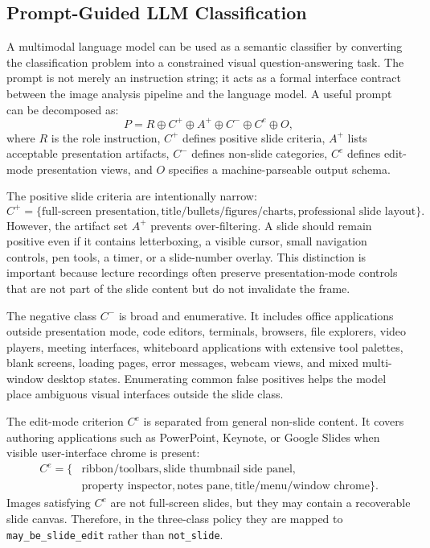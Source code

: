 \documentclass[11pt]{article}
\begin{document}
\subsection{Prompt-Guided LLM Classification}

A multimodal language model can be used as a semantic classifier by converting the classification problem into a constrained visual question-answering task. The prompt is not merely an instruction string; it acts as a formal interface contract between the image analysis pipeline and the language model. A useful prompt can be decomposed as:
\[
P = R \oplus C^+ \oplus A^+ \oplus C^- \oplus C^e \oplus O,
\]
where $R$ is the role instruction, $C^+$ defines positive slide criteria, $A^+$ lists acceptable presentation artifacts, $C^-$ defines non-slide categories, $C^e$ defines edit-mode presentation views, and $O$ specifies a machine-parseable output schema.

The positive slide criteria are intentionally narrow:
\[
C^+ =
\{\text{full-screen presentation},
\text{title/bullets/figures/charts},
\text{professional slide layout}\}.
\]
However, the artifact set $A^+$ prevents over-filtering. A slide should remain positive even if it contains letterboxing, a visible cursor, small navigation controls, pen tools, a timer, or a slide-number overlay. This distinction is important because lecture recordings often preserve presentation-mode controls that are not part of the slide content but do not invalidate the frame.

The negative class $C^-$ is broad and enumerative. It includes office applications outside presentation mode, code editors, terminals, browsers, file explorers, video players, meeting interfaces, whiteboard applications with extensive tool palettes, blank screens, loading pages, error messages, webcam views, and mixed multi-window desktop states. Enumerating common false positives helps the model place ambiguous visual interfaces outside the slide class.

The edit-mode criterion $C^e$ is separated from general non-slide content. It covers authoring applications such as PowerPoint, Keynote, or Google Slides when visible user-interface chrome is present:
\[
\begin{aligned}
C^e=\{&
\text{ribbon/toolbars},
\text{slide thumbnail side panel},\\
&\text{property inspector},
\text{notes pane},
\text{title/menu/window chrome}\}.
\end{aligned}
\]
Images satisfying $C^e$ are not full-screen slides, but they may contain a recoverable slide canvas. Therefore, in the three-class policy they are mapped to \texttt{may\_be\_slide\_edit} rather than \texttt{not\_slide}.
\end{document}
